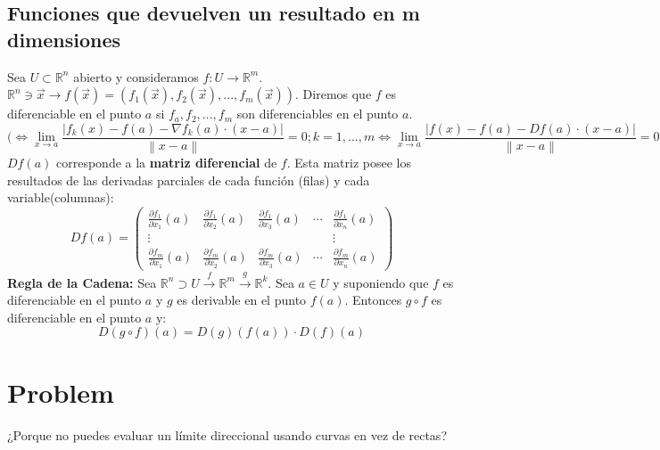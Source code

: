 \documentclass[11pt]{article}
\providecommand{\norm}[1]{\left\lVert #1 \right \rVert}
\providecommand{\abs}[1]{\left\lvert #1\right\rvert}
\providecommand{\norm}[1]{\left\lVert #1 \right \rVert}
\providecommand{\abs}[1]{\left\lvert #1\right\rvert}
\newcommand{\R}{\mathbb{R}}
\theoremstyle{plain}
\begin{document}
        \subsection{Funciones que devuelven un resultado en m dimensiones} %
        \label{sub:funciones_que_devuelven_un_resultado_en_m_dimensiones}
            Sea $U \subset \R^n$ abierto y consideramos $f:U \rightarrow \R^m$. $\R^n \ni \vec{x} \rightarrow f(\vec{x}) = (f_1(\vec{x}),f_2(\vec{x}),...,f_m(\vec{x}))$. Diremos que $f$ es diferenciable en el punto $a$ si $f_a,f_2,...,f_m$ son diferenciables en el punto $a$.
            \[(\Leftrightarrow \lim_{x\to a} \frac{\abs{f_k(x) -f(a) - \nabla f_k(a)\cdot(x-a)}}{\norm{x-a}}=0; k = 1,...,m \Leftrightarrow \lim_{x\to a} \frac{\abs{f(x) -f(a) - Df(a)\cdot(x-a)}}{\norm{x-a}}=0\]
            $Df(a)$ corresponde a la \textbf{matriz diferencial} de $f$. Esta matriz posee los resultados de las derivadas parciales de cada función (filas) y cada variable(columnas):
            \begin{equation}
                Df(a) = 
                \begin{pmatrix}
                    \frac{\partial f_1}{\partial x_1}(a)&\frac{\partial f_1}{\partial x_2}(a)&\frac{\partial f_1}{\partial x_3}(a)&\cdots & \frac{\partial f_1}{\partial x_n}(a)\\
                    \vdots&&&&\vdots\\
                    \frac{\partial f_m}{\partial x_1}(a)&\frac{\partial f_m}{\partial x_2}(a)&\frac{\partial f_m}{\partial x_3}(a)&\cdots & \frac{\partial f_m}{\partial x_n}(a)

                \end{pmatrix}
            \end{equation}
            \textbf{Regla de la Cadena:} Sea $\R^n \supset U \xrightarrow{f} \R^m \xrightarrow{g} \R^k$. Sea $a \in U$ y suponiendo que $f$ es diferenciable en el punto $a$ y $g$ es derivable en el punto $f(a)$. Entonces $g \circ f$ es diferenciable en el punto $a$ y:
            \[D(g\circ f)(a) = D(g)(f(a)) \cdot D(f)(a)\]

    \section{Problem} %
    \label{sec:problem}
        ¿Porque no puedes evaluar un límite direccional usando curvas en vez de rectas?
\end{document}
